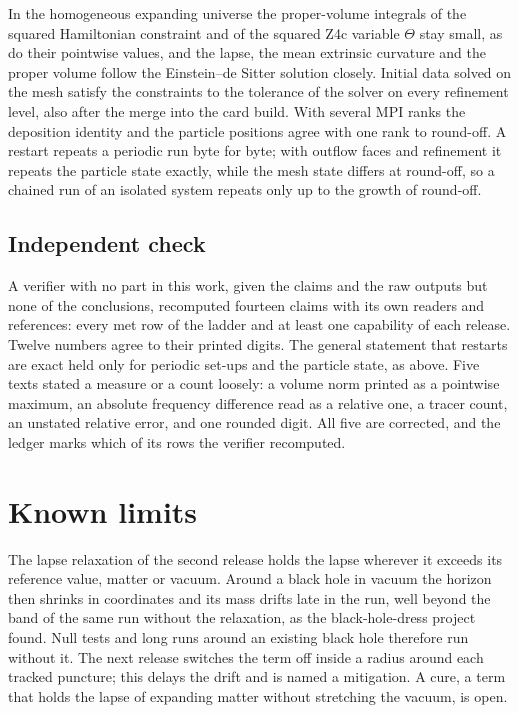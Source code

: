 \documentclass[aps,prd,twocolumn,superscriptaddress,nofootinbib,floatfix]{revtex4-2}
\begin{document}
In the homogeneous expanding universe the proper-volume integrals of the squared
Hamiltonian constraint and of the squared Z4c variable $\Theta$ stay small, as do their
pointwise values, and the lapse, the mean extrinsic curvature and the proper volume
follow the Einstein--de Sitter solution closely. Initial data solved on the mesh satisfy the
constraints to the tolerance of the solver on every refinement level, also after the
merge into the card build. With several MPI ranks the deposition identity and the
particle positions agree with one rank to round-off. A restart repeats a periodic run
byte for byte; with outflow faces and refinement it repeats the particle state exactly,
while the mesh state differs at round-off, so a chained run of an isolated system
repeats only up to the growth of round-off.

\subsection{Independent check}

A verifier with no part in this work, given the claims and the raw outputs but none of
the conclusions, recomputed fourteen claims with its own readers and references: every
met row of the ladder and at least one capability of each release. Twelve numbers agree
to their printed digits. The general statement that restarts are exact held only for
periodic set-ups and the particle state, as above. Five texts stated a measure or a count
loosely: a volume norm printed as a pointwise maximum, an absolute frequency difference
read as a relative one, a tracer count, an unstated relative error, and one rounded
digit. All five are corrected, and the ledger marks which of its rows the verifier
recomputed.

\section{Known limits}\label{sec:limits}

The lapse relaxation of the second release holds the lapse wherever it exceeds its
reference value, matter or vacuum. Around a black hole in vacuum the horizon then
shrinks in coordinates and its mass drifts late in the run, well beyond the band of the
same run without the relaxation, as the black-hole-dress project found. Null tests and
long runs around an existing black hole therefore run without it. The next release
switches the term off inside a radius around each tracked puncture; this delays the
drift and is named a mitigation. A cure, a term that holds the lapse of expanding matter
without stretching the vacuum, is open.
\end{document}
